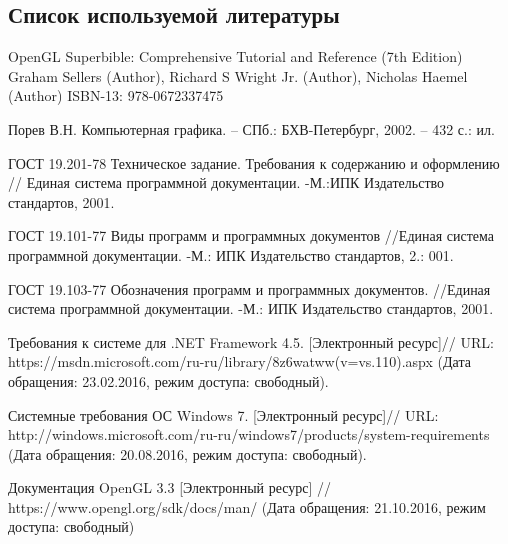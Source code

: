 \subsection{Список используемой литературы}
\begin{my_enumerate}
\item
OpenGL Superbible: Comprehensive Tutorial and Reference (7th Edition)
Graham Sellers (Author), Richard S Wright Jr. (Author), Nicholas Haemel (Author)
ISBN-13: 978-0672337475

\item
Порев В.Н. Компьютерная графика. – СПб.: БХВ-Петербург, 2002. – 432 с.: ил.

\item
ГОСТ 19.201-78 Техническое задание. Требования к содержанию и оформлению // Единая система программной документации. -М.:ИПК Издательство стандартов, 2001.

\item
ГОСТ 19.101-77 Виды программ и программных документов
//Единая система программной документации. -М.: ИПК Издательство стандартов, 2.: 001.

\item
ГОСТ 19.103-77 Обозначения программ и программных документов. //Единая система программной документации. -М.: ИПК Издательство стандартов, 2001.

\item 
Требования к системе для .NET Framework 4.5. [Электронный ресурс]// URL:
https://msdn.microsoft.com/ru-ru/library/8z6watww(v=vs.110).aspx (Дата обращения:
23.02.2016, режим доступа: свободный).

\item 
Системные требования ОС Windows 7. [Электронный ресурс]// URL:
http://windows.microsoft.com/ru-ru/windows7/products/system-requirements
(Дата
обращения: 20.08.2016, режим доступа: свободный).

\item
Документация OpenGL 3.3 [Электронный ресурс] // https://www.opengl.org/sdk/docs/man/ (Дата обращения: 21.10.2016, режим доступа: свободный)

\end{my_enumerate}

